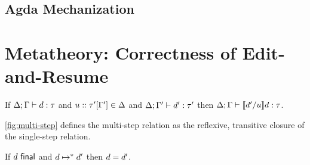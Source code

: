 



\subsection{Agda Mechanization}
\label{sec:agda-mechanization}




{\color{gray}\blindtext}


\section{Metatheory: Correctness of Edit-and-Resume}
\label{sec:resumption}




{\color{gray}\blindtext}


\begin{theorem}[Instantiation]
  If $\Delta; \Gamma \vdash d : \tau$
  and $u :: \tau'[\Gamma']\in\Delta$
  and $\Delta; \Gamma' \vdash d' : \tau'$
  then $\Delta; \Gamma \vdash \llbracket d' / u\rrbracket d : \tau$.
\end{theorem}

\autoref{fig:multi-step} defines the multi-step relation as the reflexive,
transitive closure of the single-step relation.

\begin{lemma}[Finality]
  If $d~\mathsf{final}$ and $d \mapsto^* d'$
  then $d=d'$.
\end{lemma}

